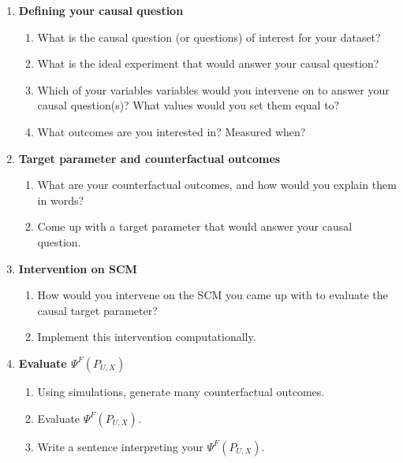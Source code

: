 \documentclass[answers]{exam}
\newenvironment{packed_item}{
\begin{itemize}
 \setlength{\itemsep}{0pt}
  \setlength{\parskip}{0pt}
  \setlength{\parsep}{0pt}
}{\end{itemize}}
\begin{document}
\begin{enumerate}
\item \textbf{Defining your causal question}
\begin{enumerate}
\item What is the causal question (or questions) of interest for your dataset?
\item What is the ideal experiment that would answer your causal question?
\item Which of your variables variables would you intervene on to answer your causal question(s)? What values would you set them equal to?
\item What outcomes are you interested in? Measured when?
\end{enumerate}
\item \textbf{Target parameter and counterfactual outcomes}
\begin{enumerate}
\item What are your counterfactual outcomes, and how would you explain them in words?
\item Come up with a target parameter that would answer your causal question.
\end{enumerate}
\item\textbf{Intervention on SCM}
\begin{enumerate}
\item How would you intervene on the SCM you came up with to evaluate the causal target parameter?
\item Implement this intervention computationally.
\end{enumerate}
\item\textbf{Evaluate $\Psi^F(P_{U,X})$}
\begin{enumerate}
\item Using simulations, generate many counterfactual outcomes.
\item Evaluate $\Psi^F(P_{U,X})$.
\item Write a sentence interpreting your $\Psi^F(P_{U,X})$.
\end{enumerate}
\end{enumerate}
\end{document}

